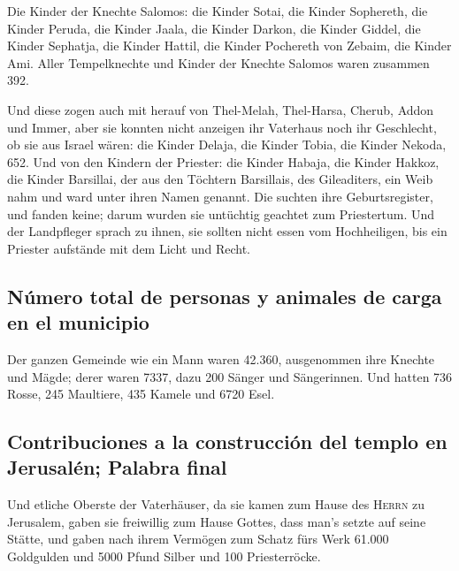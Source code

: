  Die Kinder der Knechte Salomos: die Kinder Sotai, die
Kinder Sophereth, die Kinder Peruda,  die Kinder Jaala,
die Kinder Darkon, die Kinder Giddel,  die Kinder
Sephatja, die Kinder Hattil, die Kinder Pochereth von Zebaim, die Kinder
Ami.  Aller Tempelknechte und Kinder der Knechte Salomos
waren zusammen 392.

 Und diese zogen auch mit herauf von Thel-Melah,
Thel-Harsa, Cherub, Addon und Immer, aber sie konnten nicht anzeigen ihr
Vaterhaus noch ihr Geschlecht, ob sie aus Israel wären: 
die Kinder Delaja, die Kinder Tobia, die Kinder Nekoda, 652.
 Und von den Kindern der Priester: die Kinder Habaja, die
Kinder Hakkoz, die Kinder Barsillai, der aus den Töchtern Barsillais,
des Gileaditers, ein Weib nahm und ward unter ihren Namen genannt.
 Die suchten ihre Geburtsregister, und fanden keine;
darum wurden sie untüchtig geachtet zum Priestertum.  Und
der Landpfleger sprach zu ihnen, sie sollten nicht essen vom
Hochheiligen, bis ein Priester aufstände mit dem Licht und Recht.

\hypertarget{nuxfamero-total-de-personas-y-animales-de-carga-en-el-municipio}{%
\subsection{Número total de personas y animales de carga en el
municipio}\label{nuxfamero-total-de-personas-y-animales-de-carga-en-el-municipio}}

 Der ganzen Gemeinde wie ein Mann waren 42.360,
 ausgenommen ihre Knechte und Mägde; derer waren 7337,
dazu 200 Sänger und Sängerinnen.  Und hatten 736 Rosse,
245 Maultiere,  435 Kamele und 6720 Esel.

\hypertarget{contribuciones-a-la-construcciuxf3n-del-templo-en-jerusaluxe9n-palabra-final}{%
\subsection{Contribuciones a la construcción del templo en Jerusalén;
Palabra
final}\label{contribuciones-a-la-construcciuxf3n-del-templo-en-jerusaluxe9n-palabra-final}}

 Und etliche Oberste der Vaterhäuser, da sie kamen zum
Hause des \textsc{Herrn} zu Jerusalem, gaben sie freiwillig zum Hause
Gottes, dass man's setzte auf seine Stätte,  und gaben
nach ihrem Vermögen zum Schatz fürs Werk 61.000 Goldgulden und 5000
Pfund Silber und 100 Priesterröcke.

